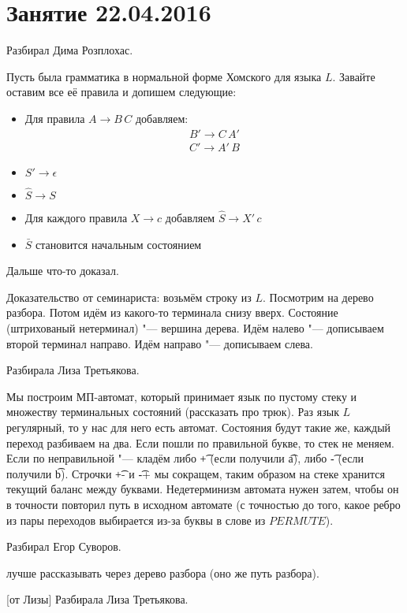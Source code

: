 \chapter{Занятие 22.04.2016}

	Разбирал Дима Розплохас.

	Пусть была грамматика в нормальной форме Хомского для языка $L$.
	Завайте оставим все её правила и допишем следующие:
	\begin{itemize}
		\item
			Для правила $A \to B\,C$ добавляем:
			\begin{gather*}
				B' \to C\, A' \\
				C' \to A'\, B
			\end{gather*}
		\item
			$S' \to \epsilon$
		\item
			$\hat S \to S$
		\item
			Для каждого правила $X \to c$ добавляем $\hat S \to X'\, c$
		\item
			$\bar S$ становится начальным состоянием
	\end{itemize}
	Дальше что-то доказал.

	Доказательство от семинариста: возьмём строку из $L$.
	Посмотрим на дерево разбора.
	Потом идём из какого-то терминала снизу вверх.
	Состояние (штрихованый нетерминал) "--- вершина дерева.
	Идём налево "--- дописываем второй терминал направо.
	Идём направо "--- дописываем слева.

	Разбирала Лиза Третьякова.

	Мы построим МП-автомат, который принимает язык по пустому стеку и множеству терминальных состояний (\TODO рассказать про трюк).
	Раз язык $L$ регулярный, то у нас для него есть автомат.
	Состояния будут такие же, каждый переход разбиваем на два.
	Если пошли по правильной букве, то стек не меняем.
	Если по неправильной "--- кладём либо \t{+} (если получили \t{a}),
	либо \t{-} (если получили \t{b}).
	Строчки \t{+-} и \t{-+} мы сокращем, таким образом на стеке хранится текущий баланс между буквами.
	Недетерминизм автомата нужен затем, чтобы он в точности повторил путь в исходном автомате (с точностью
	до того, какое ребро из пары переходов выбирается из-за буквы в слове из $PERMUTE$).

	Разбирал Егор Суворов.

	\TODO лучше рассказывать через дерево разбора (оно же путь разбора).

[от Лизы]\label{prob44}
	Разбирала Лиза Третьякова.


